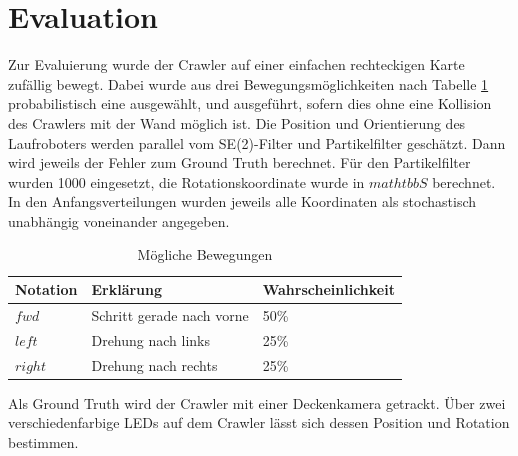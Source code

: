 \clearpage
\section{Evaluation}

Zur Evaluierung wurde der Crawler auf einer einfachen rechteckigen Karte zufällig bewegt. Dabei wurde aus drei Bewegungsmöglichkeiten nach Tabelle \ref{tab:vars} probabilistisch eine ausgewählt, und ausgeführt, sofern dies ohne eine Kollision des Crawlers mit der Wand möglich ist. Die Position und Orientierung des Laufroboters werden parallel vom SE(2)-Filter und Partikelfilter geschätzt. Dann wird jeweils der Fehler zum Ground Truth berechnet. Für den Partikelfilter wurden 1000 eingesetzt, die Rotationskoordinate wurde in $mathtbb{S}$ berechnet.
In den Anfangsverteilungen wurden jeweils alle Koordinaten als stochastisch unabhängig voneinander angegeben.

\begin{table}[h!]
	\centering
	\caption{Mögliche Bewegungen}
	\label{tab:vars}
	\begin{tabular}{lll}
		\toprule
		Notation & Erklärung & Wahrscheinlichkeit\\
		\midrule
		$fwd$ 	& Schritt gerade nach vorne & 50\%\\
		$left$	& Drehung nach links		& 25\%\\
		$right$	& Drehung nach rechts		& 25\%\\

		\bottomrule
	\end{tabular}
\end{table}

Als Ground Truth wird der Crawler mit einer Deckenkamera getrackt. Über zwei verschiedenfarbige LEDs auf dem Crawler lässt sich dessen Position und Rotation bestimmen.

